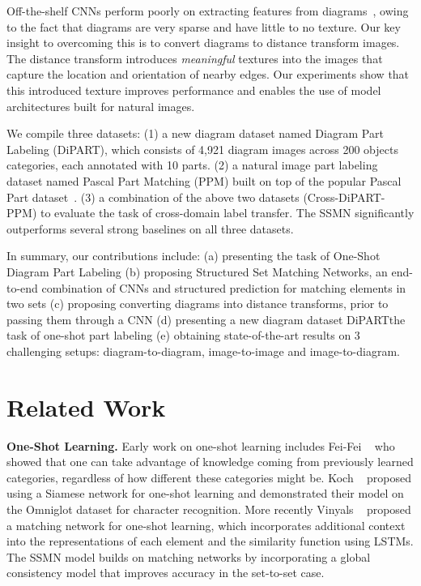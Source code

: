 \documentclass[10pt,twocolumn,letterpaper]{article}
\newcommand{\dataset}{\mbox{DiPART}}
\begin{document}
Off-the-shelf CNNs perform poorly on extracting features from diagrams~\cite{Kembhavi2016ADI, Yu2016SketchaNetAD}, owing to the fact that diagrams are very sparse and have little to no texture. Our key insight to overcoming this is to convert diagrams to distance transform images. The distance transform introduces \textit{meaningful} textures into the images that capture the location and orientation of nearby edges. Our experiments show that this introduced texture improves performance and enables the use of model architectures built for natural images.

We compile three datasets: (1) a new diagram dataset named Diagram Part Labeling (\dataset), which consists of 4,921 diagram images across 200 objects categories, each annotated with 10 parts. (2) a natural image part labeling dataset named Pascal Part Matching (PPM) built on top of the popular Pascal Part dataset~\cite{chenMLFUY14}. (3) a combination of the above two datasets (Cross-DiPART-PPM) to evaluate the task of cross-domain label transfer. The SSMN significantly outperforms several strong baselines on all three datasets. 

In summary, our contributions include: (a) presenting the task of One-Shot Diagram Part Labeling (b) proposing Structured Set Matching Networks, an end-to-end combination of CNNs and structured prediction for matching elements in two sets (c) proposing converting diagrams into distance transforms, prior to passing them through a CNN (d) presenting a new diagram dataset \dataset\towards the task of one-shot part labeling (e) obtaining state-of-the-art results on 3 challenging setups: diagram-to-diagram, image-to-image and image-to-diagram.


\section{Related Work}
\label{sec:background}
\noindent\textbf{One-Shot Learning.}
Early work on one-shot learning includes Fei-Fei \etal~\cite{FeiFei2003ABA, FeiFei2006OneshotLO} who showed that one can take advantage of knowledge coming from previously learned categories, regardless of how different these categories might be. Koch \etal~\cite{Koch2015SiameseNN} proposed using a Siamese network for one-shot learning and demonstrated their model on the Omniglot dataset for character recognition. More recently Vinyals \etal~\cite{vinyalsBLKW16} proposed a matching network for one-shot learning, which incorporates additional context into the representations of each element and the similarity function using LSTMs. The SSMN model builds on matching networks by incorporating a global consistency model that improves accuracy in the set-to-set case.
\end{document}
